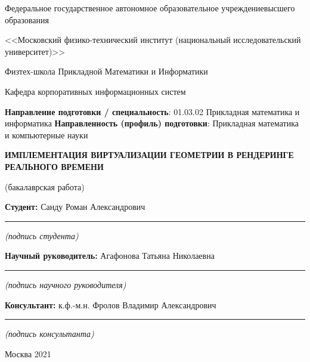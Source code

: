\documentclass[12pt]{extarticle}
\renewcommand*{\maketitle}{
\begin{titlepage}
  \begin{center}
    \linespread{1}
    \small
    Федеральное государственное автономное образовательное учреждение\break высшего образования\par
    <<Московский физико-технический институт \break (национальный исследовательский университет)>>\par
    Физтех-школа Прикладной Математики и Информатики\par
    Кафедра корпоративных информационных систем\par
  \end{center}
%
  {
    \small
    {\bf Направление подготовки / специальность}: 01.03.02 Прикладная математика и информатика\newline
    {\bf Направленность (профиль) подготовки}: Прикладная математика и компьютерные науки
  }
%
  {
    \topskip0pt
    \vspace*{\fill}
    \begin{center}
      {\bf\Large ИМПЛЕМЕНТАЦИЯ ВИРТУАЛИЗАЦИИ ГЕОМЕТРИИ
      \break В РЕНДЕРИНГЕ РЕАЛЬНОГО ВРЕМЕНИ}\par
      (бакалаврская работа)
    \end{center}
    \vspace*{\fill}
  }
%
  \hfill
  \begin{minipage}[t]{8cm}
    {\bf Студент: \newline}
    Санду Роман Александрович\newline
    \vspace{-3mm}
    \rule{8cm}{0.15mm}
    \centerline{\scriptsize\it (подпись студента)}\newline
%
    {\bf Научный руководитель: \newline}
    Агафонова Татьяна Николаевна\newline
    \vspace{-3mm}
    \rule{8cm}{0.15mm}
    \centerline{\scriptsize\it (подпись научного руководителя)}
%
    {\bf Консультант: \newline}
    к.ф.-м.н. Фролов Владимир Александрович\newline
    \vspace{-3mm}
    \rule{8cm}{0.15mm}
    \centerline{\scriptsize\it (подпись консультанта)}
  \end{minipage}

    \vspace*{\fill}
    \begin{center}
      Москва 2021
    \end{center}
\end{titlepage}
}
\begin{document}
\maketitle

\newpage
\setcounter{page}{2}

\vspace*{\fill}
\begin{abstract}
Данная работа посвящена решению задачи адаптивного рендеринга в приложениях реального времени. В качестве цели работы была выбрана имплементация иерархического атласа с виртуальным текстурированием, одного из актуальных подходов к решению этой задачи. В результате работы был выявлен и исправлен ряд недостатков и неточностей этой техники, и предложены улучшения оригинального метода. Была написана эффективная многопоточная реализация приложения конвертации моделей в формат иерархического атласа, а также приложение для рендеринга конвертированных моделей с использованием современного графического API ``Vulkan''.
\end{abstract}
\vspace*{\fill}

\newpage
\tableofcontents
\newpage






\newpage
\printbibliography
\end{document}
